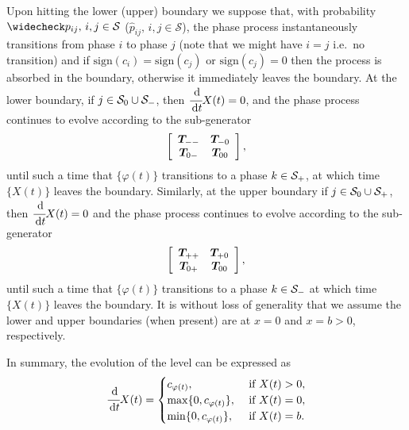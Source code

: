 Upon hitting the lower (upper) boundary we suppose that, with probability \(\widecheck p_{ij},\,i,j\in\mathcal S\) (\(\widehat p_{ij},\,i,j\in\mathcal S\)), the phase process instantaneously transitions from phase \(i\) to phase \(j\) (note that we might have \(i=j\) i.e.~no transition) and if \(\mathrm{sign}(c_i)=\mathrm{sign}(c_j)\) or \(\mathrm{sign}(c_j)=0\) then the process is absorbed in the boundary, otherwise it immediately leaves the boundary. At the lower boundary, if \(j\in\mathcal{S}_0\cup\mathcal{S}_-\), then \(\cfrac{\, \mathrm{d}}{\, \mathrm{d} t} X(t) = 0\), and the phase process continues to evolve according to the sub-generator 
\[\left[\begin{array}{cc} \boldsymbol T_{--} & \boldsymbol T_{-0} \\ \boldsymbol T_{0-} & \boldsymbol T_{00}  \end{array}\right],\]
until such a time that \(\{\varphi(t)\}\) transitions to a phase \(k\in\mathcal{S}_+\), at which time \(\{X(t)\}\) leaves the boundary. Similarly, at the upper boundary if \(j\in\mathcal{S}_0\cup\mathcal{S}_+\), then \(\cfrac{\, \mathrm{d}}{\, \mathrm{d} t} X(t) = 0\) and the phase process continues to evolve according to the sub-generator 
\[\left[\begin{array}{cc} \boldsymbol T_{++} & \boldsymbol T_{+0} \\ \boldsymbol T_{0+} & \boldsymbol T_{00}  \end{array}\right],\]
until such a time that \(\{\varphi(t)\}\) transitions to a phase \(k\in\mathcal{S}_-\) at which time \(\{X(t)\}\) leaves the boundary. It is without loss of generality that we assume the lower and upper boundaries (when present) are at \(x=0\) and \(x=b>0\), respectively.

In summary, the evolution of the level can be expressed as 
\[\cfrac{\, \mathrm{d}}{\, \mathrm{d} t} X(t) = \begin{cases} c_{\varphi(t)}, & \mbox{ if } X(t)>0, \\ \max\{0,c_{\varphi(t)}\}, & \mbox{ if } X(t)=0, \\ \min\{0,c_{\varphi(t)}\}, & \mbox{ if } X(t)=b.  \end{cases}\]

